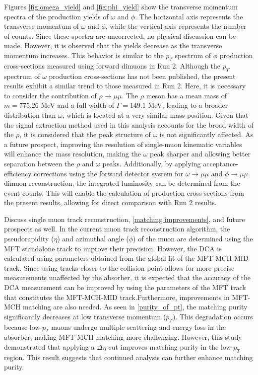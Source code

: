     Figures \ref{fig:omega_yield} and \ref{fig:phi_yield} show the transverse momentum spectra of the production yields of $\omega$ and $\phi$. The horizontal axis represents the transverse momentum of $\omega$ and $\phi$, while the vertical axis represents the number of counts.  
    Since these spectra are uncorrected, no physical discussion can be made. However, it is observed that the yields decrease as the transverse momentum increases. This behavior is similar to the $p_T$ spectrum of $\phi$ production cross-sections measured using forward dimuons in Run 2. Although the $p_T$ spectrum of $\omega$ production cross-sections has not been published, the present results exhibit a similar trend to those measured in Run 2.  
    Here, it is necessary to consider the contribution of $\rho \rightarrow \mu\mu$. The $\rho$ meson has a mean mass of $m = 775.26$ MeV and a full width of $\Gamma = 149.1$ MeV, leading to a broader distribution than $\omega$, which is located at a very similar mass position. Given that the signal extraction method used in this analysis accounts for the broad width of the $\rho$, it is considered that the peak structure of $\omega$ is not significantly affected.  
    As a future prospect, improving the resolution of single-muon kinematic variables will enhance the mass resolution, making the $\omega$ peak sharper and allowing better separation between the $\rho$ and $\omega$ peaks. Additionally, by applying acceptance-efficiency corrections using the forward detector system for $\omega \rightarrow \mu\mu$ and $\phi \rightarrow \mu\mu$ dimuon reconstruction, the integrated luminosity can be determined from the event counts. This will enable the calculation of production cross-sections from the present results, allowing for direct comparison with Run 2 results.


    Discuss single muon track reconstruction, \ref{matching improvements}, and future prospects as well. In the current muon track reconstruction algorithm, the pseudorapidity (\(\eta\)) and azimuthal angle (\(\phi\)) of the muon are determined using the MFT standalone track to improve their precision. However, the DCA is calculated using parameters obtained from the global fit of the MFT-MCH-MID track. Since using tracks closer to the collision point allows for more precise measurements unaffected by the absorber, it is expected that the accuracy of the DCA measurement can be improved by using the parameters of the MFT track that constitutes the MFT-MCH-MID track.Furthermore, improvements in MFT-MCH matching are also needed. As seen in \ref{purity_of_pt}, the matching purity significantly decreases at low transverse momentum (\( p_T \)). This degradation occurs because low-\( p_T \) muons undergo multiple scattering and energy loss in the absorber, making MFT-MCH matching more challenging. However, this study demonstrated that applying a \( \Delta \eta \) cut improves matching purity in the low-\( p_T \) region. This result suggests that continued analysis can further enhance matching purity.


